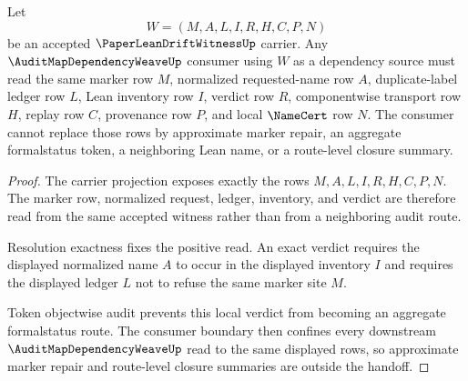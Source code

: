 \begin{theorem}
\label{thm:paper-lean-drift-witness-auditmap-dependency-source-lock}
Let
$$
W=(M,A,L,I,R,H,C,P,N)
$$
be an accepted $\PaperLeanDriftWitnessUp$ carrier. Any $\AuditMapDependencyWeaveUp$ consumer using $W$ as a dependency source must read the same marker row $M$, normalized requested-name row $A$, duplicate-label ledger row $L$, Lean inventory row $I$, verdict row $R$, componentwise transport row $H$, replay row $C$, provenance row $P$, and local $\NameCert$ row $N$. The consumer cannot replace those rows by approximate marker repair, an aggregate formalstatus token, a neighboring Lean name, or a route-level closure summary.
\end{theorem}
\begin{proof}
The carrier projection exposes exactly the rows $M,A,L,I,R,H,C,P,N$. The marker row, normalized request, ledger, inventory, and verdict are therefore read from the same accepted witness rather than from a neighboring audit route.

Resolution exactness fixes the positive read. An exact verdict requires the displayed normalized name $A$ to occur in the displayed inventory $I$ and requires the displayed ledger $L$ not to refuse the same marker site $M$.

Token objectwise audit prevents this local verdict from becoming an aggregate formalstatus route. The consumer boundary then confines every downstream $\AuditMapDependencyWeaveUp$ read to the same displayed rows, so approximate marker repair and route-level closure summaries are outside the handoff.
\end{proof}

